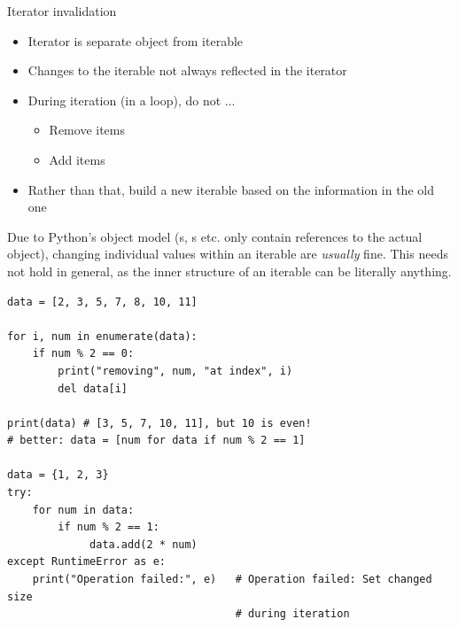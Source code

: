 
\begin{frame}[fragile]{Iterator invalidation}
%
\begin{itemize}
\item Iterator is separate object from iterable
\item[\Thus] Changes to the iterable not always reflected in the iterator
\item[\Thus] During iteration (\ie in a  loop), do not ...
	\begin{itemize}
	\item Remove items
	\item Add items
	\end{itemize}
\item Rather than that, build a new iterable based on the information in the old one
\end{itemize}
%
\begin{hintbox}
\footnotesize
Due to Python's object model (s, s etc. only contain references to the actual object), changing individual values within an iterable are \emph{usually} fine. This needs not hold in general, as the inner structure of an iterable can be literally anything.
\end{hintbox}
%
\end{frame}


\begin{frame}[fragile]
%
\begin{codebox}
\begin{verbatim}
data = [2, 3, 5, 7, 8, 10, 11]

for i, num in enumerate(data):
    if num % 2 == 0:
        print("removing", num, "at index", i)
        del data[i]

print(data) # [3, 5, 7, 10, 11], but 10 is even!
# better: data = [num for data if num % 2 == 1]

data = {1, 2, 3}
try:
    for num in data:
        if num % 2 == 1:
             data.add(2 * num)
except RuntimeError as e:
    print("Operation failed:", e)   # Operation failed: Set changed size 
                                    # during iteration
\end{verbatim}
\end{codebox}
%
\end{frame}

